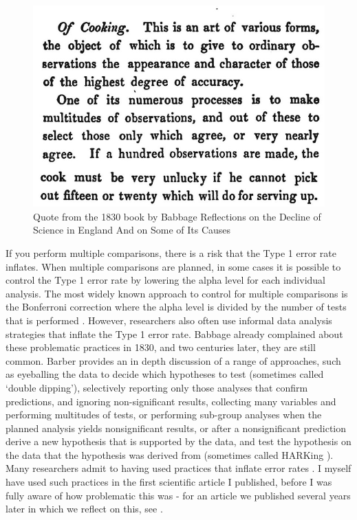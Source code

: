 \documentclass[
  oneside]{book}
\begin{document}
\begin{figure}

{\centering \includegraphics[width=1\linewidth]{images/babbagecooking} 

}

\caption{Quote from the 1830 book by Babbage Reflections on the Decline of Science in England And on Some of Its Causes}\label{fig:cooking}
\end{figure}

If you perform multiple comparisons, there is a risk that the Type 1 error rate inflates. When multiple comparisons are planned, in some cases it is possible to control the Type 1 error rate by lowering the alpha level for each individual analysis. The most widely known approach to control for multiple comparisons is the Bonferroni correction where the alpha level is divided by the number of tests that is performed \citep{dunn_multiple_1961}. However, researchers also often use informal data analysis strategies that inflate the Type 1 error rate. Babbage \citeyearpar{babbage_reflections_1830} already complained about these problematic practices in 1830, and two centuries later, they are still common. Barber \citeyearpar{barber_pitfalls_1976} provides an in depth discussion of a range of approaches, such as eyeballing the data to decide which hypotheses to test (sometimes called `double dipping'), selectively reporting only those analyses that confirm predictions, and ignoring non-significant results, collecting many variables and performing multitudes of tests, or performing sub-group analyses when the planned analysis yields nonsignificant results, or after a nonsignificant prediction derive a new hypothesis that is supported by the data, and test the hypothesis on the data that the hypothesis was derived from (sometimes called HARKing \citep{kerr_harking_1998}). Many researchers admit to having used practices that inflate error rates \citep{fiedler_questionable_2015, john_measuring_2012, van_de_schoot_use_2021, chin_questionable_2021, makel_both_2021}. I myself have used such practices in the first scientific article I published, before I was fully aware of how problematic this was - for an article we published several years later in which we reflect on this, see \citet{jostmann_short_2016}.
\end{document}
